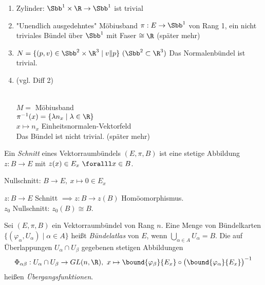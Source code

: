 \begin{exmp*}
	\begin{enumerate}[label = {\roman*})]
		\item 	Zylinder: $ \Sbb^1 \times \R \to \Sbb^1 $ ist trivial
		\item "Unendlich ausgedehntes" Möbiusband  $ \pi: E \to \Sbb^1 $ von Rang 1, ein nicht triviales Bündel über $\Sbb^1$ mit Faser $\cong \R$ (später mehr)
		\item $ N = \{(p,v) \in \Sbb^2 \times \R^3 \mid v \| p\}\ (\Sbb^2 \subset \R^3) $
			Das Normalenbündel ist trivial.
		\item \begin{minipage}{\linewidth}
				\begin{wrapfigure}{R}{5cm}
					\centering
				\end{wrapfigure}
				(vgl. Diff 2)
			\end{minipage} \\
			$ M = $ Möbiusband\\
			$ \pi^{-1}(x) = \{\lambda n_x \mid \lambda \in \R\} $\\
			$ x \mapsto n_x$ Einheitsnormalen-Vektorfeld\\
			Das Bündel ist nicht trivial. (später mehr)
	\end{enumerate}
\end{exmp*}

\begin{defn}[Schnitt]
	Ein \emph{Schnitt} eines Vektorraumbündels $ (E,\pi,B) $ ist eine stetige Abbildung $ z: B \to E $ mit $z(x) \in E_x\ \foralll x \in B$.
\end{defn}
	
\begin{exmp*}
	Nullschnitt: $ B \to E,\ x \mapsto 0 \in E_x $
\end{exmp*}

\begin{rem*}
	$ z: B \to E $ Schnitt $ \implies z: B \to z(B) $ Homöomorphismus.\\
	$z_0$ Nullschnitt: $z_0(B) \cong B$.
\end{rem*}

\begin{defn} 
	Sei $ (E,\pi,B) $ ein Vektorraumbündel von Rang $n$. Eine Menge von Bündelkarten $ \{(\varphi_\alpha, U_\alpha) \mid \alpha \in A\} $ heißt \emph{Bündelatlas} von $E$, wenn $ \bigcup_{\alpha \in A} U_\alpha = B. $
	Die auf Überlappungen $ U_\alpha \cap U_\beta $ gegebenen stetigen Abbildungen 
	$$ \Phi_{\alpha \beta}: U_\alpha \cap U_\beta \to GL(n,\R),\ x \mapsto \bound{\varphi_\beta}{E_x} \circ \big( \bound{ \varphi_\alpha}{E_x} \big)^{-1} $$
	heißen \emph{Übergangsfunktionen}.
\end{defn}

